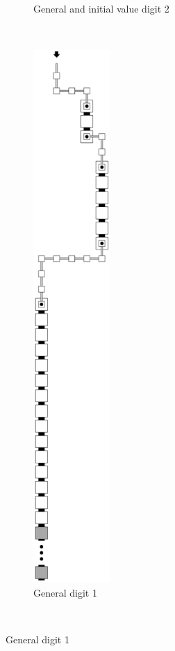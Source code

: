 \begin{figure}[H]
\begin{subfigure}[t]{0.32\textwidth}
        \caption{\label{fig:return_from_digit2_oporseed} General and initial value digit 2}
    \end{subfigure}%
    ~
    \begin{subfigure}[t]{0.32\textwidth}
        \centering
        \includegraphics[width=0.32\textwidth]{return_paths_return_from_digit_1_op}
        \caption{\label{fig:return_from_digit_1_op} General digit 1}
    \end{subfigure}%
    ~
\end{figure}

